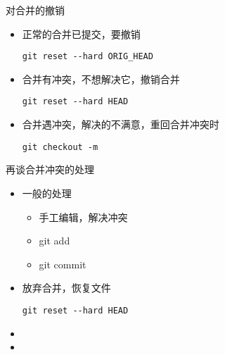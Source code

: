 \begin{frame}[<+->][fragile]{对合并的撤销}
    \begin{itemize}
        \item 正常的合并已提交，要撤销
        \begin{Verbatim}[frame=single,commandchars=\\\{\}]
git reset --hard ORIG_HEAD
        \end{Verbatim}
        \item 合并有冲突，不想解决它，撤销合并
        \begin{Verbatim}[frame=single,commandchars=\\\{\}]
git reset --hard HEAD
        \end{Verbatim}
        \item 合并遇冲突，解决的不满意，重回合并冲突时
        \begin{Verbatim}[frame=single,commandchars=\\\{\}]
git checkout -m
        \end{Verbatim}
    \end{itemize}
\end{frame}

\begin{frame}[<+->][fragile]{再谈合并冲突的处理}
    \begin{itemize}
        \item 一般的处理
            \begin{itemize}
                \item 手工编辑，解决冲突
                \item git add
                \item git commit
            \end{itemize}
        \item 放弃合并，恢复文件
        \begin{Verbatim}[frame=single,commandchars=\\\{\}]
git reset --hard HEAD
        \end{Verbatim}
        \item 
        \item
    \end{itemize}
\end{frame}

